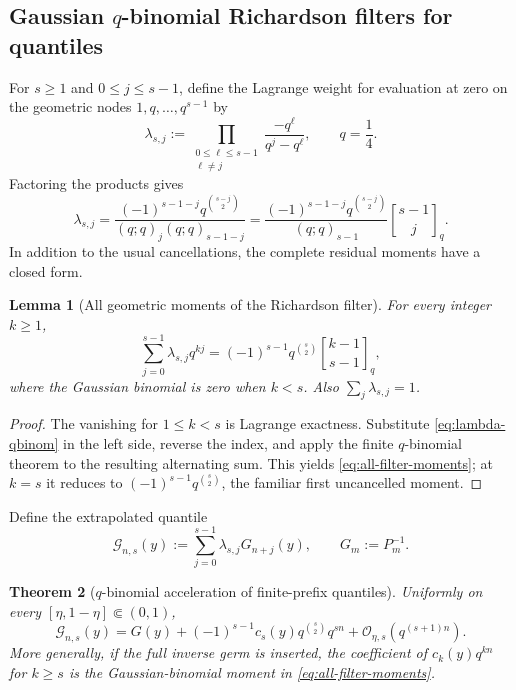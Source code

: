 \documentclass[11pt,oneside]{article}
\numberwithin{equation}{section}
\newtheorem{theorem}{Theorem}[section]
\newtheorem{lemma}[theorem]{Lemma}
\theoremstyle{definition}
\theoremstyle{remark}
\newcommand{\bigO}{\mathcal O}
\newcommand{\InvF}{G}
\newcommand{\qbinom}[3]{\genfrac{[}{]}{0pt}{}{#1}{#2}_{#3}}
\begin{document}
\subsection{Gaussian \texorpdfstring{$q$}{q}-binomial Richardson filters for quantiles}

For $s\ge1$ and $0\le j\le s-1$, define the Lagrange weight for evaluation at
zero on the geometric nodes $1,q,\ldots,q^{s-1}$ by
\begin{equation}
 \lambda_{s,j}:=
 \prod_{\substack{0\le\ell\le s-1\\\ell\ne j}}
 \frac{-q^\ell}{q^j-q^\ell},
 \qquad q=\frac14.
 \label{eq:lambda-def}
\end{equation}
Factoring the products gives
\begin{equation}
 \boxed{
 \lambda_{s,j}=
 \frac{(-1)^{s-1-j}q^{\binom{s-j}{2}}}
 {(q;q)_j(q;q)_{s-1-j}}
 =\frac{(-1)^{s-1-j}q^{\binom{s-j}{2}}}{(q;q)_{s-1}}
 \qbinom{s-1}{j}{q}.}
 \label{eq:lambda-qbinom}
\end{equation}
In addition to the usual cancellations, the complete residual moments have a closed
form.

\begin{lemma}[All geometric moments of the Richardson filter]
\label{lem:filter-moments}
For every integer $k\ge1$,
\begin{equation}
 \boxed{
 \sum_{j=0}^{s-1}\lambda_{s,j}q^{kj}
 =(-1)^{s-1}q^{\binom s2}
 \qbinom{k-1}{s-1}{q},}
 \label{eq:all-filter-moments}
\end{equation}
where the Gaussian binomial is zero when $k<s$.  Also
$\sum_j\lambda_{s,j}=1$.
\end{lemma}

\begin{proof}
The vanishing for $1\le k<s$ is Lagrange exactness.  Substitute
\eqref{eq:lambda-qbinom} in the left side, reverse the index, and apply the finite
$q$-binomial theorem \cite{GasperRahman,AndrewsPartitions} to the resulting alternating sum.  This yields
\eqref{eq:all-filter-moments}; at $k=s$ it reduces to
$(-1)^{s-1}q^{\binom s2}$, the familiar first uncancelled moment.
\end{proof}

Define the extrapolated quantile
\begin{equation}
 \mathcal G_{n,s}(y):=\sum_{j=0}^{s-1}\lambda_{s,j}G_{n+j}(y),
 \qquad G_m:=P_m^{-1}.
 \label{eq:G-richardson}
\end{equation}

\begin{theorem}[$q$-binomial acceleration of finite-prefix quantiles]
\label{thm:quantile-richardson}
Uniformly on every $[\eta,1-\eta]\Subset(0,1)$,
\begin{equation}
 \boxed{
 \mathcal G_{n,s}(y)=\InvF(y)
 +(-1)^{s-1}c_s(y)q^{\binom s2}q^{sn}
 +\bigO_{\eta,s}(q^{(s+1)n}).}
 \label{eq:quantile-richardson}
\end{equation}
More generally, if the full inverse germ is inserted, the coefficient of $c_k(y)q^{kn}$
for $k\ge s$ is the Gaussian-binomial moment in \eqref{eq:all-filter-moments}.
\end{theorem}
\end{document}
